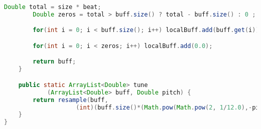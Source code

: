 \documentclass[a4paper]{article}
\begin{document}
\begin{lstlisting}[language=Java]
        Double total = size * beat;
        Double zeros = total > buff.size() ? total - buff.size() : 0 ;

        for(int i = 0; i < buff.size(); i++) localBuff.add(buff.get(i));

        for(int i = 0; i < zeros; i++) localBuff.add(0.0);

        return buff;
    }

    public static ArrayList<Double> tune
            (ArrayList<Double> buff, Double pitch) {
        return resample(buff, 
                    (int)(buff.size()*(Math.pow(Math.pow(2, 1/12.0),-pitch))));
    }
}
\end{lstlisting}
\end{document}
